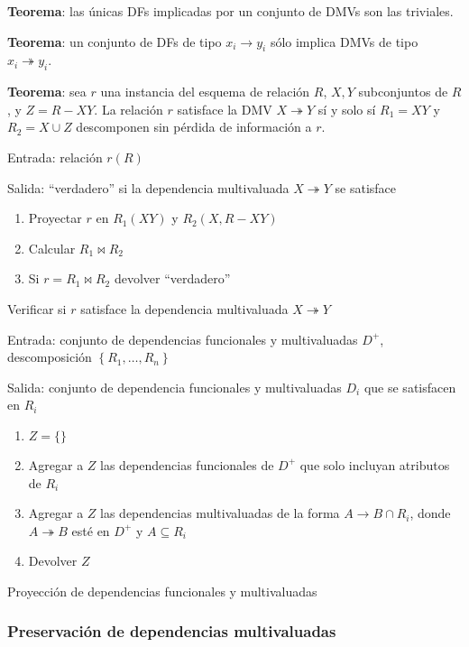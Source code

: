 \documentclass[a4paper, twoside]{article}
\begin{document}
\textbf{Teorema}: las únicas DFs implicadas por un conjunto de DMVs
son las triviales.

\textbf{Teorema}: un conjunto de DFs de tipo $x_{i}\to y_{i}$ sólo
implica DMVs de tipo $x_{i}\twoheadrightarrow y_{i}$.

\textbf{Teorema}: sea $r$ una instancia del esquema de relación $R$,
$X,Y$ subconjuntos de $R$, y $Z=R-XY$. La relación $r$ satisface
la DMV $X\twoheadrightarrow Y$ sí y solo sí $R_{1}=XY$ y $R_{2}=X\cup Z$
descomponen sin pérdida de información a $r$.

\begin{algorithm}[H]
Entrada: relación $r(R)$

Salida: ``verdadero'' si la dependencia multivaluada $X\twoheadrightarrow Y$
se satisface
\begin{enumerate}
\item Proyectar $r$ en $R_{1}(XY)$ y $R_{2}(X,R-XY)$
\item Calcular $R_{1}\bowtie R_{2}$
\item Si $r=R_{1}\bowtie R_{2}$ devolver ``verdadero''
\end{enumerate}
\protect\caption{Verificar si $r$ satisface la dependencia multivaluada $X\twoheadrightarrow Y$}
\end{algorithm}


\begin{algorithm}[H]
Entrada: conjunto de dependencias funcionales y multivaluadas $D^{+}$,
descomposición $\left\{ R_{1},\ldots,R_{n}\right\} $

Salida: conjunto de dependencia funcionales y multivaluadas $D_{i}$
que se satisfacen en $R_{i}$
\begin{enumerate}
\item $Z=\{\}$
\item Agregar a $Z$ las dependencias funcionales de $D^{+}$ que solo incluyan
atributos de $R_{i}$
\item Agregar a $Z$ las dependencias multivaluadas de la forma $A\to B\cap R_{i}$,
donde $A\twoheadrightarrow B$ esté en $D^{+}$ y $A\subseteq R_{i}$
\item Devolver $Z$
\end{enumerate}
\protect\caption{Proyección de dependencias funcionales y multivaluadas}
\end{algorithm}



\subsubsection{Preservación de dependencias multivaluadas}
\end{document}
